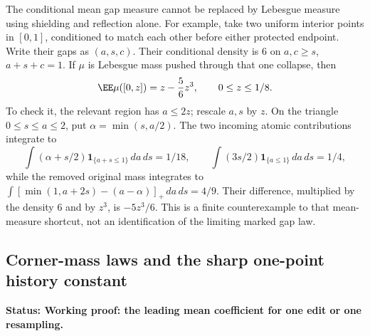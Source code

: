 \documentclass[11pt,letterpaper]{article}
\newcommand{\ind}{\mathbf 1}\newcommand{\Exp}{\operatorname{Exp}}
\newcommand{\status}[1]{\textbf{Status: #1.}}
\begin{document}
The conditional mean gap measure cannot be replaced by Lebesgue
measure using shielding and reflection alone. For example, take two
uniform interior points in $[0,1]$, conditioned to match each other
before either protected endpoint. Write their gaps as $(a,s,c)$.
Their conditional density is $6$ on $a,c\ge s$, $a+s+c=1$.
If $\mu$ is Lebesgue mass pushed through that one collapse, then
\[
 \EE\mu([0,z])=z-\frac56z^3,\qquad 0\le z\le1/8.
\]
To check it, the relevant region has $a\le2z$; rescale $a,s$ by $z$.
On the triangle $0\le s\le a\le2$, put $\alpha=\min(s,a/2)$.
The two incoming atomic contributions integrate to
\[
 \int(\alpha+s/2)\ind_{\{a+s\le1\}}\,da\,ds=1/18,
 \qquad \int(3s/2)\ind_{\{a\le1\}}\,da\,ds=1/4,
\]
while the removed original mass integrates to
$\int[\min(1,a+2s)-(a-\alpha)]_+\,da\,ds=4/9$.
Their difference, multiplied by the density $6$ and by $z^3$, is
$-5z^3/6$. This is a finite counterexample to that mean-measure shortcut,
not an identification of the limiting marked gap law.

\subsection{Corner-mass laws and the sharp one-point history constant}
\label{sec:sharp-one-history}

\status{Working proof: the leading mean coefficient for one edit or one resampling}
\end{document}
